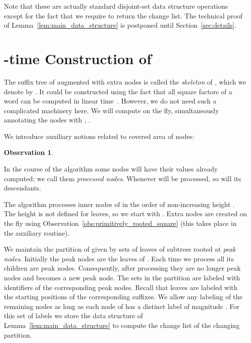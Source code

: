 \documentclass{article}
\theoremstyle{theorem}
\newtheorem{observation}{Observation}
\theoremstyle{definition}
\begin{document}
  Note that these are actually standard disjoint-set data structure operations except for the fact that
  we require  to return the change list.
  The technical proof of Lemma~\ref{lem:main_data_structure} is postponed until Section~\ref{sec:details}.


  \section{-time Construction of }\label{sec:CST_construction}
  The suffix tree of  augmented with extra nodes is called the
  \emph{skeleton} of , which we denote by .
  It could be constructed using the fact that all square factors of a word can be
  computed in linear time~\cite{DBLP:journals/jcss/GusfieldS04,Crochemore2013,DBLP:conf/spire/CrochemoreIKRRW10}.
  However, we do not need such a complicated machinery here.
  We will compute  on the fly, simultaneously annotating the nodes with , .

  We introduce auxiliary notions related to covered area of nodes:
  

  \begin{observation}
    
  \end{observation}

  \noindent
  In the course of the algorithm some nodes will have their values  already computed;
  we call them \emph{processed nodes}.
  Whenever  will be processed, so will its descendants.
    
  The algorithm processes inner nodes  of  in the order of non-increasing height .
  The height is not defined for leaves, so we start with .
  Extra nodes are created on the fly using Observation~\ref{obs:primitively_rooted_square}
  (this takes place in the auxiliary  routine).

  We maintain the partition  of  given by sets of leaves of subtrees
  rooted at \emph{peak nodes}.
  Initially the peak nodes are the leaves of .
  Each time we process  all its children are peak nodes.
  Consequently, after processing  they are no longer peak nodes and  becomes a new peak node.
  The sets in the partition are labeled with identifiers of the
  corresponding peak nodes.
  Recall that leaves are labeled with the starting positions of the corresponding suffixes. 
  We allow any labeling of the remaining nodes as long as each node of
   has a distinct label of magnitude .
  For this set of labels we store the data structure of Lemma~\ref{lem:main_data_structure}
  to compute the change list of the changing partition.
\end{document}
